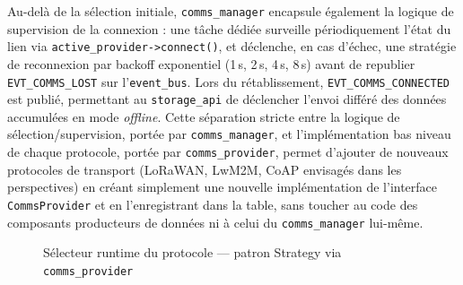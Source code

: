 Au-delà de la sélection initiale, \texttt{comms\_manager} encapsule
également la logique de supervision de la connexion : une tâche
dédiée surveille périodiquement l'état du lien via
\texttt{active\_provider->connect()}, et déclenche, en cas
d'échec, une stratégie de reconnexion par backoff exponentiel
(1\,s, 2\,s, 4\,s, 8\,s) avant de republier
\texttt{EVT\_COMMS\_LOST} sur l'\texttt{event\_bus}. Lors du
rétablissement, \texttt{EVT\_COMMS\_CONNECTED} est publié,
permettant au \texttt{storage\_api} de déclencher l'envoi différé
des données accumulées en mode \textit{offline}. Cette séparation
stricte entre la logique de sélection/supervision, portée par
\texttt{comms\_manager}, et l'implémentation bas niveau de chaque
protocole, portée par \texttt{comms\_provider}, permet d'ajouter de
nouveaux protocoles de transport (LoRaWAN, LwM2M, CoAP envisagés
dans les perspectives) 
\newpage en créant simplement une nouvelle
implémentation de l'interface \texttt{CommsProvider} et en
l'enregistrant dans la table, sans toucher au code des composants
producteurs de données ni à celui du \texttt{comms\_manager}
lui-même.

\begin{figure}[H]
\centering
{}
\caption{Sélecteur runtime du protocole — patron Strategy via \texttt{comms\_provider}}
\label{fig:comms_strategy}
\end{figure}

